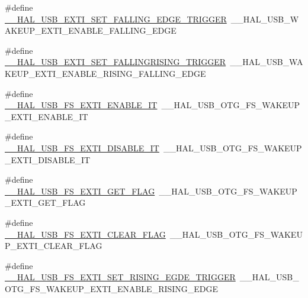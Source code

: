 \begin{DoxyCompactItemize}
\item 
\#define \hyperlink{group___h_a_l___u_s_b___aliased___macros_ga852708fb3258bdc4b7d6b246d9ac32b9}{\+\_\+\+\_\+\+H\+A\+L\+\_\+\+U\+S\+B\+\_\+\+E\+X\+T\+I\+\_\+\+S\+E\+T\+\_\+\+F\+A\+L\+L\+I\+N\+G\+\_\+\+E\+D\+G\+E\+\_\+\+T\+R\+I\+G\+G\+ER}~\+\_\+\+\_\+\+H\+A\+L\+\_\+\+U\+S\+B\+\_\+\+W\+A\+K\+E\+U\+P\+\_\+\+E\+X\+T\+I\+\_\+\+E\+N\+A\+B\+L\+E\+\_\+\+F\+A\+L\+L\+I\+N\+G\+\_\+\+E\+D\+GE
\item 
\#define \hyperlink{group___h_a_l___u_s_b___aliased___macros_gab88741810e4ac8773680c0cc6b948e37}{\+\_\+\+\_\+\+H\+A\+L\+\_\+\+U\+S\+B\+\_\+\+E\+X\+T\+I\+\_\+\+S\+E\+T\+\_\+\+F\+A\+L\+L\+I\+N\+G\+R\+I\+S\+I\+N\+G\+\_\+\+T\+R\+I\+G\+G\+ER}~\+\_\+\+\_\+\+H\+A\+L\+\_\+\+U\+S\+B\+\_\+\+W\+A\+K\+E\+U\+P\+\_\+\+E\+X\+T\+I\+\_\+\+E\+N\+A\+B\+L\+E\+\_\+\+R\+I\+S\+I\+N\+G\+\_\+\+F\+A\+L\+L\+I\+N\+G\+\_\+\+E\+D\+GE
\item 
\#define \hyperlink{group___h_a_l___u_s_b___aliased___macros_ga31a23737a111962f4231725129dcebde}{\+\_\+\+\_\+\+H\+A\+L\+\_\+\+U\+S\+B\+\_\+\+F\+S\+\_\+\+E\+X\+T\+I\+\_\+\+E\+N\+A\+B\+L\+E\+\_\+\+IT}~\+\_\+\+\_\+\+H\+A\+L\+\_\+\+U\+S\+B\+\_\+\+O\+T\+G\+\_\+\+F\+S\+\_\+\+W\+A\+K\+E\+U\+P\+\_\+\+E\+X\+T\+I\+\_\+\+E\+N\+A\+B\+L\+E\+\_\+\+IT
\item 
\#define \hyperlink{group___h_a_l___u_s_b___aliased___macros_gac7f83957a48d47ee7f44742dd7e30ff3}{\+\_\+\+\_\+\+H\+A\+L\+\_\+\+U\+S\+B\+\_\+\+F\+S\+\_\+\+E\+X\+T\+I\+\_\+\+D\+I\+S\+A\+B\+L\+E\+\_\+\+IT}~\+\_\+\+\_\+\+H\+A\+L\+\_\+\+U\+S\+B\+\_\+\+O\+T\+G\+\_\+\+F\+S\+\_\+\+W\+A\+K\+E\+U\+P\+\_\+\+E\+X\+T\+I\+\_\+\+D\+I\+S\+A\+B\+L\+E\+\_\+\+IT
\item 
\#define \hyperlink{group___h_a_l___u_s_b___aliased___macros_gabf961284ea86d34de9e320e6f04fa8af}{\+\_\+\+\_\+\+H\+A\+L\+\_\+\+U\+S\+B\+\_\+\+F\+S\+\_\+\+E\+X\+T\+I\+\_\+\+G\+E\+T\+\_\+\+F\+L\+AG}~\+\_\+\+\_\+\+H\+A\+L\+\_\+\+U\+S\+B\+\_\+\+O\+T\+G\+\_\+\+F\+S\+\_\+\+W\+A\+K\+E\+U\+P\+\_\+\+E\+X\+T\+I\+\_\+\+G\+E\+T\+\_\+\+F\+L\+AG
\item 
\#define \hyperlink{group___h_a_l___u_s_b___aliased___macros_ga50dabd1d5a2ad8d58e598a9faf24d812}{\+\_\+\+\_\+\+H\+A\+L\+\_\+\+U\+S\+B\+\_\+\+F\+S\+\_\+\+E\+X\+T\+I\+\_\+\+C\+L\+E\+A\+R\+\_\+\+F\+L\+AG}~\+\_\+\+\_\+\+H\+A\+L\+\_\+\+U\+S\+B\+\_\+\+O\+T\+G\+\_\+\+F\+S\+\_\+\+W\+A\+K\+E\+U\+P\+\_\+\+E\+X\+T\+I\+\_\+\+C\+L\+E\+A\+R\+\_\+\+F\+L\+AG
\item 
\#define \hyperlink{group___h_a_l___u_s_b___aliased___macros_ga0b77287493d393b314f03576b105134e}{\+\_\+\+\_\+\+H\+A\+L\+\_\+\+U\+S\+B\+\_\+\+F\+S\+\_\+\+E\+X\+T\+I\+\_\+\+S\+E\+T\+\_\+\+R\+I\+S\+I\+N\+G\+\_\+\+E\+G\+D\+E\+\_\+\+T\+R\+I\+G\+G\+ER}~\+\_\+\+\_\+\+H\+A\+L\+\_\+\+U\+S\+B\+\_\+\+O\+T\+G\+\_\+\+F\+S\+\_\+\+W\+A\+K\+E\+U\+P\+\_\+\+E\+X\+T\+I\+\_\+\+E\+N\+A\+B\+L\+E\+\_\+\+R\+I\+S\+I\+N\+G\+\_\+\+E\+D\+GE

\end{DoxyCompactItemize}
